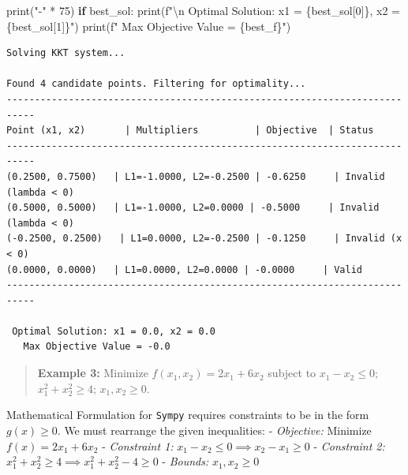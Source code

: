 \documentclass[
  letterpaper,
  DIV=11,
  numbers=noendperiod]{scrreprt}
\newenvironment{Shaded}{\begin{snugshade}}{\end{snugshade}}
\newcommand{\BuiltInTok}[1]{\textcolor[rgb]{0.00,0.23,0.31}{#1}}
\newcommand{\CharTok}[1]{\textcolor[rgb]{0.13,0.47,0.30}{#1}}
\newcommand{\ControlFlowTok}[1]{\textcolor[rgb]{0.00,0.23,0.31}{\textbf{#1}}}
\newcommand{\DecValTok}[1]{\textcolor[rgb]{0.68,0.00,0.00}{#1}}
\newcommand{\NormalTok}[1]{\textcolor[rgb]{0.00,0.23,0.31}{#1}}
\newcommand{\OperatorTok}[1]{\textcolor[rgb]{0.37,0.37,0.37}{#1}}
\newcommand{\SpecialCharTok}[1]{\textcolor[rgb]{0.37,0.37,0.37}{#1}}
\newcommand{\SpecialStringTok}[1]{\textcolor[rgb]{0.13,0.47,0.30}{#1}}
\newcommand{\StringTok}[1]{\textcolor[rgb]{0.13,0.47,0.30}{#1}}
\begin{document}
\begin{Shaded}
\begin{Highlighting}[]
\BuiltInTok{print}\NormalTok{(}\StringTok{"{-}"} \OperatorTok{*} \DecValTok{75}\NormalTok{)}
\ControlFlowTok{if}\NormalTok{ best\_sol:}
    \BuiltInTok{print}\NormalTok{(}\SpecialStringTok{f"}\CharTok{\textbackslash{}n}\SpecialStringTok{ Optimal Solution: x1 = }\SpecialCharTok{\{}\NormalTok{best\_sol[}\DecValTok{0}\NormalTok{]}\SpecialCharTok{\}}\SpecialStringTok{, x2 = }\SpecialCharTok{\{}\NormalTok{best\_sol[}\DecValTok{1}\NormalTok{]}\SpecialCharTok{\}}\SpecialStringTok{"}\NormalTok{)}
    \BuiltInTok{print}\NormalTok{(}\SpecialStringTok{f"   Max Objective Value = }\SpecialCharTok{\{}\NormalTok{best\_f}\SpecialCharTok{\}}\SpecialStringTok{"}\NormalTok{)}
\end{Highlighting}
\end{Shaded}

\begin{verbatim}
Solving KKT system...

Found 4 candidate points. Filtering for optimality...
---------------------------------------------------------------------------
Point (x1, x2)       | Multipliers          | Objective  | Status
---------------------------------------------------------------------------
(0.2500, 0.7500)   | L1=-1.0000, L2=-0.2500 | -0.6250     | Invalid (lambda < 0)
(0.5000, 0.5000)   | L1=-1.0000, L2=0.0000 | -0.5000     | Invalid (lambda < 0)
(-0.2500, 0.2500)   | L1=0.0000, L2=-0.2500 | -0.1250     | Invalid (x < 0)
(0.0000, 0.0000)   | L1=0.0000, L2=0.0000 | -0.0000     | Valid
---------------------------------------------------------------------------

 Optimal Solution: x1 = 0.0, x2 = 0.0
   Max Objective Value = -0.0
\end{verbatim}

\begin{quote}
\textbf{Example 3:} Minimize \(f(x_1,x_2)=2x_1+6x_2\) subject to
\(x_1-x_2\le 0\); \(x_1^2+x_2^2\ge 4\); \(x_1,x_2\ge 0\).
\end{quote}

Mathematical Formulation for \texttt{Sympy} requires constraints to be
in the form \(g(x) \ge 0\). We must rearrange the given inequalities: -
\emph{Objective:} Minimize \(f(x) = 2x_1 + 6x_2\) - \emph{Constraint 1:}
\(x_1 - x_2 \le 0 \implies x_2 - x_1 \ge 0\) - \emph{Constraint 2:}
\(x_1^2 + x_2^2 \ge 4 \implies x_1^2 + x_2^2 - 4 \ge 0\) -
\emph{Bounds:} \(x_1, x_2 \ge 0\)
\end{document}
